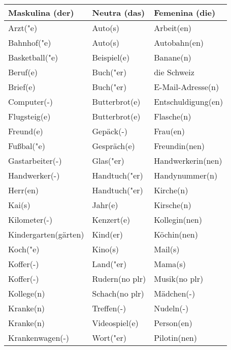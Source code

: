 \documentclass{article}
\renewcommand{\arraystretch}{1}
\begin{document}
\begin{table}[h!]
    \centering
    \label{tab:tabla1}
    \renewcommand{\arraystretch}{1.5}
    \begin{tabular}{|>{\raggedright\arraybackslash}p{5cm}|>{\raggedright\arraybackslash}p{5cm}|>{\raggedright\arraybackslash}p{5cm}|}
        \hline
        \rowcolor{gray!20} \textbf{Maskulina (der)} & \textbf{Neutra (das)} & \textbf{Femenina (die)} \\
        \hline
        Arzt("e) & Auto(s) & Arbeit(en) \\\hline
        Bahnhof("e) & Auto(s) & Autobahn(en) \\\hline
        Basketball("e) & Beispiel(e) & Banane(n) \\\hline
        Beruf(e) & Buch("er) & die Schweiz \\\hline
        Brief(e) & Buch("er) & E-Mail-Adresse(n) \\\hline
        Computer(-) & Butterbrot(e) & Entschuldigung(en) \\\hline
        Flugsteig(e) & Butterbrot(e) & Flasche(n) \\\hline
        Freund(e) & Gepäck(-) & Frau(en) \\\hline
        Fu\ss{}bal("e) & Gespräch(e) & Freundin(nen) \\\hline
        Gastarbeiter(-) & Glas("er) & Handwerkerin(nen) \\\hline
        Handwerker(-) & Handtuch("er) & Handynummer(n) \\\hline
        Herr(en) & Handtuch("er) & Kirche(n) \\\hline
        Kai(s) & Jahr(e) & Kirsche(n) \\\hline
        Kilometer(-) & Kenzert(e) & Kollegin(nen) \\\hline
        Kindergarten(gärten) & Kind(er) & Köchin(nen) \\\hline
        Koch("e) & Kino(s) & Mail(s) \\\hline
        Koffer(-) & Land("er) & Mama(s) \\\hline
        Koffer(-) & Rudern(no plr) & Musik(no plr) \\\hline
        Kollege(n) & Schach(no plr) & Mädchen(-) \\\hline
        Kranke(n) & Treffen(-) & Nudeln(-) \\\hline
        Kranke(n) & Videospiel(e) & Person(en) \\\hline
        Krankenwagen(-) & Wort("er) & Pilotin(nen) \\\hline

\end{tabular}
\end{table}
\end{document}
